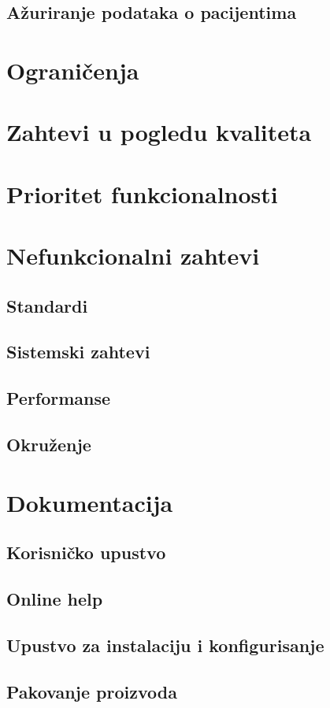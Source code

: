 \section{Ažuriranje podataka o pacijentima}




\chapter{Ograničenja}




\chapter{Zahtevi u pogledu kvaliteta}




\chapter{Prioritet funkcionalnosti}




\chapter{Nefunkcionalni zahtevi}

\section{Standardi}

\section{Sistemski zahtevi}

\section{Performanse}

\section{Okruženje}




\chapter{Dokumentacija}

\section{Korisničko upustvo}

\section{Online help} %

\section{Upustvo za instalaciju i konfigurisanje}

\section{Pakovanje proizvoda}